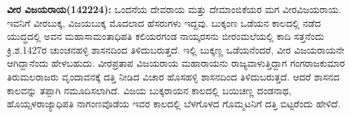 \textbf{ವೀರ ವಿಜಯರಾಯ(1422\general{\enginline{-}}24):} ಒಂದನೆಯ ದೇವರಾಯ ಮತ್ತು ದೇಮಾಂಬಿಕೆಯರ ಮಗ ವೀರವಿಜಯರಾಯ. ಇವನಿಗೆ ವೀರಬುಕ್ಕ, ವಿಜಯಬುಕ್ಕ ಮೊದಲಾದ ಹೆಸರುಗಳು ಇದ್ದವು. ಬುಕ್ಕಂಣ ಒಡೆಯನ ಕಾಲದಲ್ಲಿ ನಡೆದ ಯುದ್ಧದಲ್ಲಿ ಅವನ ಮಹಾಸಾಮಂತಾಧಿಪತಿ ಕಲಿಯರಗಂಡ ನಾಯ್ಕರಸನು ಬೀರಂಮಲೆಯಲ್ಲಿ ಕಾದಿ ಸತ್ತನೆಂದು ಕ್ರಿ.ಶ.1427ರ ಚುಂಚನಹಳ್ಳಿ ಶಾಸನದಿಂದ ತಿಳಿದುಬರುತ್ತದೆ. ಇಲ್ಲಿ ಬುಕ್ಕಣ್ಣ ಒಡೆಯನೆಂದರೆ, ವೀರ ವಿಜಯರಾಯನೇ ಆಗಿದ್ದಾನೆಂದು ಹೇಳಬಹುದು. ವೀರಪ್ರತಾಪ ವಿಜಯರಾಯ ಮಹಾರಾಯನು ರಾಜ್ಯವಾಳುತ್ತಿದ್ದಾಗ ಗಂಗರಾಜಕುಮಾರ ತಿರುಮಲರಾಜರು ವೃಂದಾವನಕ್ಕೆ ದತ್ತಿ ನೀಡಿದ ವಿಚಾರ ಹೊಸಹಳ್ಳಿ ಶಾಸನದಿಂದ ತಿಳಿದುಬರುತ್ತದೆ. ಆದರೆ ಶಾಸನದ ಕಾಲವನ್ನು ತಪ್ಪಾಗಿ ನಮೂದಿಸಲಾಗಿದೆ. ವಿಜಯ ಬುಕ್ಕರಾಯನ ಕಾಲದಲ್ಲಿ ಬಯಿಚಣ್ಣ ದಂಡನಾಥ, ಹೊಯ್ಸಳರಾಜ್ಯಾಧಿಪತಿ ನಾಗಂಣವೊಡೆಯ ಇವರ ಕಾಲದಲ್ಲಿ ಬೆಳಗೊಳದ ಗೊಮ್ಮಟನಿಗೆ ದತ್ತಿ ಬಿಟ್ಟರೆಂದು ಹೇಳಿದೆ.


